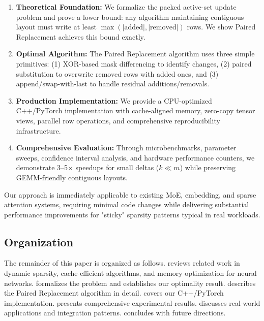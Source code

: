 \documentclass{article}
\numberwithin{equation}{section}
\theoremstyle{plain}
\theoremstyle{definition}
\theoremstyle{remark}
\begin{document}
\begin{enumerate}
    \item \textbf{Theoretical Foundation:} We formalize the packed active-set update problem and prove a lower bound: any algorithm maintaining contiguous layout must write at least $\max(|\text{added}|, |\text{removed}|)$ rows. We show Paired Replacement achieves this bound exactly.
    
    \item \textbf{Optimal Algorithm:} The Paired Replacement algorithm uses three simple primitives: (1) XOR-based mask differencing to identify changes, (2) paired substitution to overwrite removed rows with added ones, and (3) append/swap-with-last to handle residual additions/removals.
    
    \item \textbf{Production Implementation:} We provide a CPU-optimized C++/PyTorch implementation with cache-aligned memory, zero-copy tensor views, parallel row operations, and comprehensive reproducibility infrastructure.
    
    \item \textbf{Comprehensive Evaluation:} Through microbenchmarks, parameter sweeps, confidence interval analysis, and hardware performance counters, we demonstrate 3--5$\times$ speedups for small deltas ($k \ll m$) while preserving GEMM-friendly contiguous layouts.
\end{enumerate}

Our approach is immediately applicable to existing MoE, embedding, and sparse attention systems, requiring minimal code changes while delivering substantial performance improvements for "sticky" sparsity patterns typical in real workloads.

\subsection{Organization}

The remainder of this paper is organized as follows.  reviews related work in dynamic sparsity, cache-efficient algorithms, and memory optimization for neural networks.  formalizes the problem and establishes our optimality result.  describes the Paired Replacement algorithm in detail.  covers our C++/PyTorch implementation.  presents comprehensive experimental results.  discusses real-world applications and integration patterns.  concludes with future directions.
\end{document}
